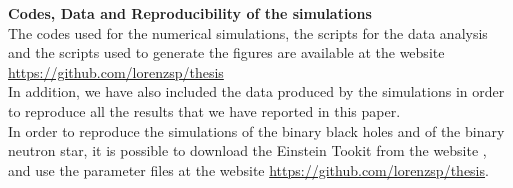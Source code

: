 \textbf{Codes, Data and Reproducibility of the simulations}\\
The codes used for the numerical simulations, the scripts for the data analysis and the scripts used to generate the figures are available at the website
\\
\url{https://github.com/lorenzsp/thesis}
\\
In addition, we have also included the data produced by the simulations in order to reproduce all the results that we have reported in this paper. \\
In order to reproduce the simulations of the binary black holes and of the binary neutron star, it is possible to download the Einstein Tookit from the website \cite{EinsteinToolkit:web}, and use the parameter files at the website \url{https://github.com/lorenzsp/thesis}.
